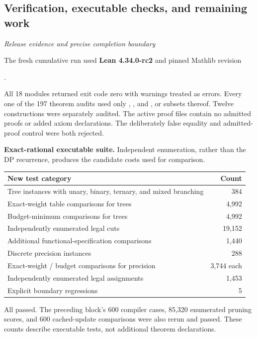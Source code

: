 \subsection{Verification, executable checks, and remaining work}\label{supp3:subsection:007}\textit{Release evidence and precise completion boundary}\par
The fresh cumulative run used \textbf{Lean 4.34.0-rc2} and pinned Mathlib revision
\begin{center}.\end{center}
All 18 modules returned exit code zero with warnings treated as errors. Every one of the 197 theorem audits used only , , and , or subsets thereof. Twelve constructions were separately audited. The active proof files contain no admitted proofs or added axiom declarations. The deliberately false equality and admitted-proof control were both rejected.

\textbf{Exact-rational executable suite.} Independent enumeration, rather than the DP recurrence, produces the candidate costs used for comparison.
\begin{center}\small
\renewcommand{\arraystretch}{1.18}
\begin{tabular}{@{}p{}r@{}}
\toprule
New test category & Count\\
\midrule
Tree instances with unary, binary, ternary, and mixed branching & 384\\
Exact-weight table comparisons for trees & 4,992\\
Budget-minimum comparisons for trees & 4,992\\
Independently enumerated legal cuts & 19,152\\
Additional functional-specification comparisons & 1,440\\
Discrete precision instances & 288\\
Exact-weight / budget comparisons for precision & 3,744 each\\
Independently enumerated legal assignments & 1,453\\
Explicit boundary regressions & 5\\
\bottomrule
\end{tabular}
\end{center}
All passed. The preceding block's 600 compiler cases, 85,320 enumerated pruning scores, and 600 cached-update comparisons were also rerun and passed. These counts describe executable tests, not additional theorem declarations.

